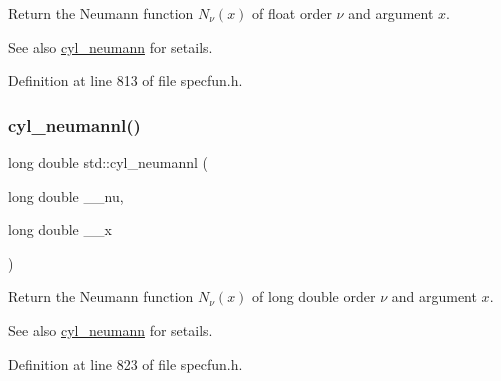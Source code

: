 Return the Neumann function $ N_{\nu}(x) $ of {\ttfamily float} order $ \nu $ and argument $ x $.

\begin{DoxySeeAlso}{See also}
\hyperlink{group__tr29124__math__spec__func_gaa5720700a9d1c33f30b53c6b30ec3260}{cyl\+\_\+neumann} for setails. 
\end{DoxySeeAlso}


Definition at line 813 of file specfun.\+h.

\mbox{\label{group__tr29124__math__spec__func_gaf8986bae9a523c48d861d233835bda8f}} 
\subsubsection{\texorpdfstring{cyl\+\_\+neumannl()}{cyl\_neumannl()}}
{\footnotesize\ttfamily long double std\+::cyl\+\_\+neumannl (\begin{DoxyParamCaption}\item[{long double}]{\+\_\+\+\_\+nu,  }\item[{long double}]{\+\_\+\+\_\+x }\end{DoxyParamCaption})\hspace{0.3cm}{\ttfamily [inline]}}

Return the Neumann function $ N_{\nu}(x) $ of {\ttfamily long double} order $ \nu $ and argument $ x $.

\begin{DoxySeeAlso}{See also}
\hyperlink{group__tr29124__math__spec__func_gaa5720700a9d1c33f30b53c6b30ec3260}{cyl\+\_\+neumann} for setails. 
\end{DoxySeeAlso}


Definition at line 823 of file specfun.\+h.

\mbox{\label{group__tr29124__math__spec__func_ga8be90518215c6209679785e5444ee0af}} 
